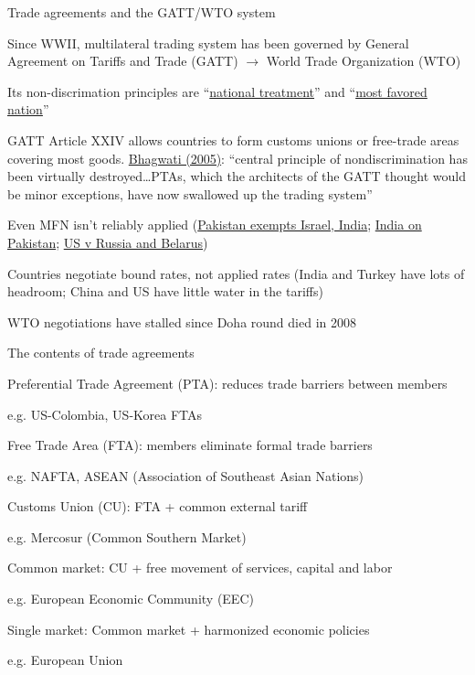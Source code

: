 \documentclass[11pt,notes=hide,aspectratio=169]{beamer}
\begin{document}
\begin{frame}{Trade agreements and the GATT/WTO system}
\begin{itemize}{\small
\item Since WWII, multilateral trading system has been governed by General Agreement on Tariffs and Trade (GATT) $\to$ World Trade Organization (WTO)
\item Its non-discrimation principles are ``\href{https://www.youtube.com/watch?v=y1DW-xPGgdI}{national treatment}'' and ``\href{https://www.youtube.com/watch?v=Q5_Bh-Y48_E}{most favored nation}''
\item {GATT Article XXIV allows countries to form customs unions or free-trade areas covering most goods.
\href{https://web.archive.org/web/20131107225336/https://www.cfr.org/trade/truth-trade/p7606}{Bhagwati (2005)}: ``central principle of nondiscrimination has been virtually destroyed\dots PTAs, which the architects of the GATT thought would be minor exceptions, have now swallowed up the trading system''\par}
\item Even MFN isn't reliably applied (\href{https://timesofislamabad.com/22-Nov-2016/pakistan-extends-mfn-to-all-countries-except-india-israel}{Pakistan exempts Israel, India};
\href{https://economictimes.indiatimes.com/news/politics-and-nation/pakistans-most-favoured-nation-status-crapped/articleshow/68018002.cms?from=mdr}{India on Pakistan}; \href{https://crsreports.congress.gov/product/pdf/IF/IF12071}{US v Russia and Belarus})
\item Countries negotiate bound rates, not applied rates (India and Turkey have lots of headroom; China and US have little water in the tariffs)
\item WTO negotiations have stalled since Doha round died in 2008
\par}\end{itemize}
\end{frame}
\begin{frame}{The contents of trade agreements}
\begin{itemize}
{\small
\item Preferential Trade Agreement (PTA): reduces trade barriers between members
\item[] e.g. US-Colombia, US-Korea FTAs
\item Free Trade Area (FTA):  members eliminate formal trade barriers
\item[] e.g. NAFTA, ASEAN (Association of Southeast Asian Nations)
\item Customs Union (CU): FTA + common external tariff
\item[] e.g. Mercosur (Common Southern Market)
\item Common market: CU + free movement of services, capital and labor
\item[] e.g. European Economic Community (EEC)
\item Single market: Common market + harmonized economic policies
\item[] e.g. European Union
}
\end{itemize}
\end{frame}
\end{document}
